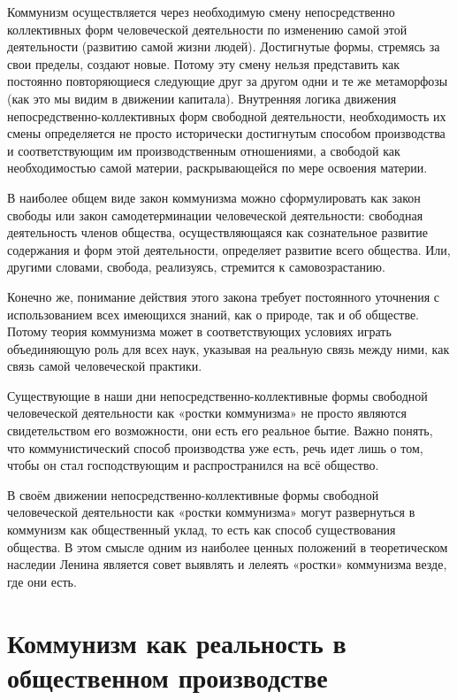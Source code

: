 \documentclass[12pt,a4paper,openany]{book}
\begin{document}
Коммунизм осуществляется через необходимую смену непосредственно коллективных форм человеческой деятельности по изменению самой этой деятельности (развитию самой жизни людей). Достигнутые формы, стремясь за свои пределы, создают новые. Потому эту смену нельзя представить как постоянно повторяющиеся следующие друг за другом одни и те же метаморфозы (как это мы видим в движении капитала). Внутренняя логика движения непосредственно-коллективных форм свободной деятельности, необходимость их смены определяется не просто исторически достигнутым способом производства и соответствующим им производственным отношениями, а свободой как необходимостью самой материи, раскрывающейся по мере освоения материи.

В наиболее общем виде закон коммунизма можно сформулировать как закон свободы или закон самодетерминации человеческой деятельности: свободная деятельность членов общества, осуществляющаяся как сознательное развитие содержания и форм этой деятельности, определяет развитие всего общества. Или, другими словами, свобода, реализуясь, стремится к самовозрастанию.

Конечно же, понимание действия этого закона требует постоянного уточнения с использованием всех имеющихся знаний, как о природе, так и об обществе. Потому теория коммунизма может в соответствующих условиях играть объединяющую роль для всех наук, указывая на реальную связь между ними, как связь самой человеческой практики.

Существующие в наши дни непосредственно-коллективные формы свободной человеческой деятельности как «ростки коммунизма» не просто являются свидетельством его возможности, они есть его реальное бытие. Важно понять, что коммунистический способ производства уже есть, речь идет лишь о том, чтобы он стал господствующим и распространился на всё общество.

В своём движении непосредственно-коллективные формы свободной человеческой деятельности как «ростки коммунизма» могут развернуться в коммунизм как общественный уклад, то есть как способ существования общества. В этом смысле одним из наиболее ценных положений в теоретическом наследии Ленина является совет выявлять и лелеять «ростки» коммунизма везде, где они есть.
\ifSubfilesClassLoaded{\setcounter{page}{19}}{}
\section{Коммунизм как реальность в общественном производстве}
\label{sec:04_kommunizm_realnost}
\end{document}
